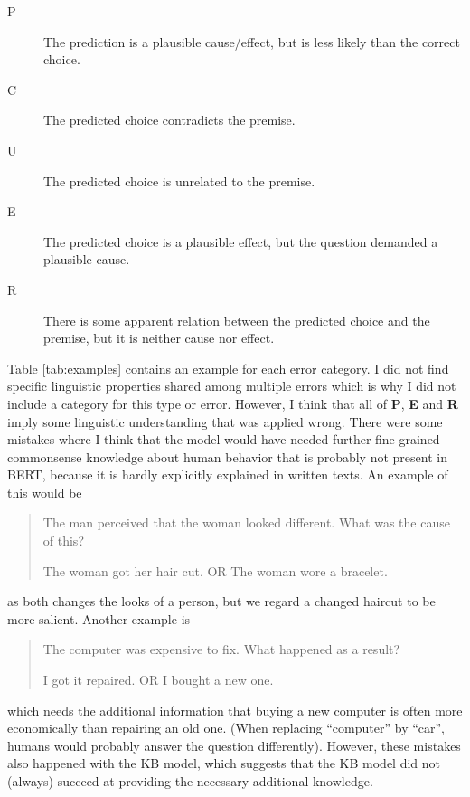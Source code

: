 \documentclass{article}
\begin{document}
\begin{description}
\item[P] The prediction is a plausible cause/effect, but is less likely than the correct choice.
\item[C] The predicted choice contradicts the premise.
\item[U] The predicted choice is unrelated to the premise.
  
\item[E] The predicted choice is a plausible effect, but the question
  demanded a plausible cause.
\item[R] There is some apparent relation between the predicted choice and the premise, but it is neither cause nor effect.
\end{description}



Table \ref{tab:examples} contains an example for each error category.
I did not find specific linguistic properties shared among multiple
errors which is why I did not include a category for this type or
error.  However, I think that all of \textbf{P}, \textbf{E} and
\textbf{R} imply some linguistic understanding that was applied wrong.
There were some mistakes where I think that the model would have
needed further fine-grained commonsense knowledge about human behavior
that is probably not present in \textsc{BERT}, because it is hardly
explicitly explained in written texts.  An example of this would be

\begin{quote}
  The man perceived that the woman looked different. What was the cause of this?

  The woman got her hair cut. OR The woman wore a bracelet.
\end{quote}

as both changes the looks of a person, but we regard a changed haircut
to be more salient.  Another example is

\begin{quote}
  The computer was expensive to fix.  What happened as a result?

  I got it repaired. OR I bought a new one.
  
\end{quote}

which needs the additional information that buying a new computer is
often more economically than repairing an old one. (When replacing
``computer'' by ``car'', humans would probably answer the question
differently).  However, these mistakes also happened with the KB
model, which suggests that the KB model did not (always) succeed at
providing the necessary additional knowledge.
\end{document}
